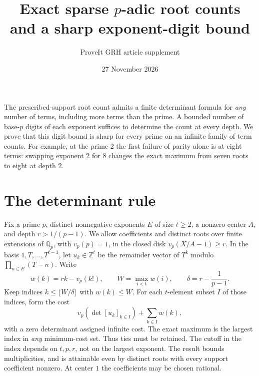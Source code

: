 \documentclass[11pt]{article}
\title{\vspace{-1.6em}Exact sparse \(p\)-adic root counts\\ and a sharp exponent-digit bound}
\author{ProveIt GRH article supplement}
\date{27 November 2026}
\newcommand{\Z}{\mathbb Z}
\newcommand{\Q}{\mathbb Q}
\begin{document}
\maketitle

The prescribed-support root count admits a finite determinant formula
for \emph{any} number of terms, including more terms than the prime.
A bounded number of base-\(p\) digits of each exponent suffices to
determine the count at every depth. We prove that this digit bound
is sharp for every prime on an infinite family of term counts.
For example, at the prime 2 the first failure of parity alone is
at eight terms: swapping exponent 2 for 8 changes the exact maximum
from seven roots to eight at depth 2.

\section{The determinant rule}
Fix a prime \(p\), distinct nonnegative exponents \(E\) of size \(t\ge2\),
a nonzero center \(A\), and depth \(r>1/(p-1)\).
We allow coefficients and distinct roots over finite extensions of
\(\Q_p\), with \(v_p(p)=1\), in the closed disk \(v_p(X/A-1)\ge r\).
In the basis \(1,T,\ldots,T^{t-1}\), let \(u_k\in\Z^t\) be the remainder
vector of \(T^k\) modulo \(\prod_{n\in E}(T-n)\). Write
\[
 w(k)=rk-v_p(k!),\qquad W=\max_{i<t}w(i),\qquad
 \delta=r-\frac1{p-1}.
\]
Keep indices \(k\le\lfloor W/\delta\rfloor\) with \(w(k)\le W\).
For each \(t\)-element subset \(I\) of those indices, form the cost
\[
 v_p\!\left(\det [u_k]_{k\in I}\right)+\sum_{k\in I}w(k),
\]
with a zero determinant assigned infinite cost.
The exact maximum is the largest index in \emph{any} minimum-cost
set. Thus ties must be retained. The cutoff in the index depends on
\(t,p,r\), not on the largest exponent. The result bounds multiplicities,
and is attainable even by distinct roots with every support coefficient
nonzero. At center \(1\) the coefficients may be chosen rational.
\end{document}
